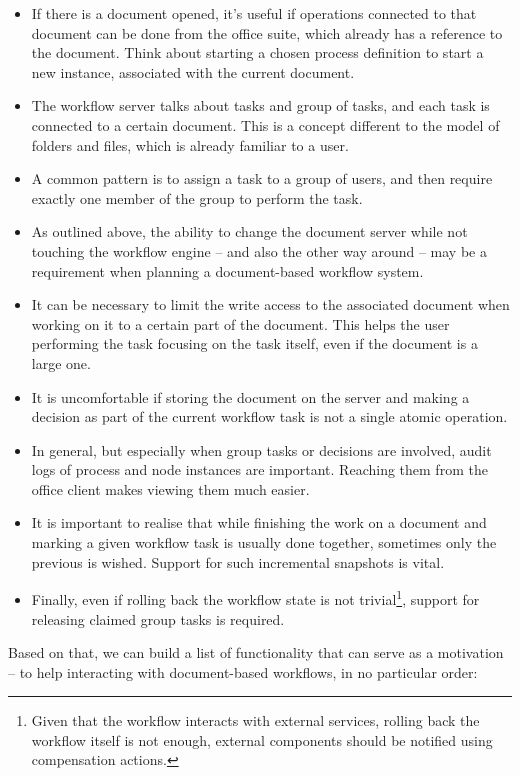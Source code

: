 \begin{itemize}
\item If there is a document opened, it's useful if operations connected to
that document can be done from the office suite, which already has a reference
to the document. Think about starting a chosen process definition to start a
new instance, associated with the current document.
\item The workflow server talks about tasks and group of tasks, and each task
is connected to a certain document. This is a concept different to the model of
folders and files, which is already familiar to a user.
\item A common pattern is to assign a task to a group of users, and then
require exactly one member of the group to perform the task.
\item As outlined above, the ability to change the document server while not
touching the workflow engine -- and also the other way around -- may be a
requirement when planning a document-based workflow system.
\item It can be necessary to limit the write access to the associated document
when working on it to a certain part of the document. This helps the user
performing the task focusing on the task itself, even if the document is a
large one.
\item It is uncomfortable if storing the document on the server and making a
decision as part of the current workflow task is not a single atomic operation.
\item In general, but especially when group tasks or decisions are involved, audit logs of
process and node instances are important. Reaching them from the office client
makes viewing them much easier.
\item It is important to realise that while finishing the work on a document
and marking a given workflow task is usually done together, sometimes only the
previous is wished. Support for such incremental snapshots is vital.
\item Finally, even if rolling back the workflow state is not
trivial\footnote{Given that the workflow interacts with external services,
rolling back the workflow itself is not enough, external components should be
notified using compensation actions.}, support
for releasing claimed group tasks is required.
\end{itemize}

Based on that, we can build a list of functionality that can serve as a
motivation -- to help interacting with document-based workflows, in no
particular order:

